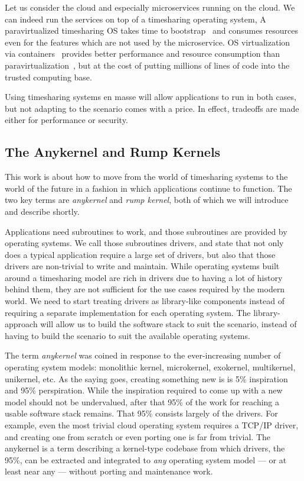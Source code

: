 Let us consider the cloud and especially microservices running on the cloud.
We can indeed run the services on top of a timesharing operating system,
A paravirtualized timesharing OS takes time to bootstrap~\cite{jiang:soda}
and consumes resources even for the features which are not used by
the microservice.  OS virtualization via containers~\cite{phk:jails}
provides better performance and resource consumption than
paravirtualization~\cite{soltesz:containers,wang:overhead}, but at the
cost of putting millions of lines of code into the trusted computing base.

Using timesharing systems en masse will allow applications to run in both
cases, but not adapting to the scenario comes with a price.  In effect,
tradeoffs are made either for performance or security.


\subsection{The Anykernel and Rump Kernels}

This work is about how to move from the world of timesharing systems
to the world of the future in a fashion in which applications continue
to function.  The two key terms are \textit{anykernel} and
\textit{rump kernel}, both of which we will introduce and describe shortly.

Applications need subroutines to work, and those subroutines are provided
by operating systems.  We call those subroutines drivers, and state that
not only does a typical application require a large set of drivers,
but also that those drivers are non-trivial to write and maintain.  While
operating systems built around a timesharing model are rich in drivers
due to having a lot of history behind them, they are not sufficient for
the use cases required by the modern world.  We need to
start treating drivers as library-like components instead of requiring a
separate implementation for each operating system.  The library-approach
will allow us to build the software stack to suit the scenario, instead of
having to build the scenario to suit the available operating systems.

The term \textit{anykernel} was coined in response to the ever-increasing
number of operating system models: monolithic kernel, microkernel,
exokernel, multikernel, unikernel, etc.  As the saying goes,
creating something new is is 5\% inspiration and 95\% perspiration.
While the inspiration required to come up with a new model should not be
undervalued, after that 95\% of the work for reaching a usable software
stack remains.  That 95\% consists largely of the drivers.  For example,
even the most trivial cloud operating system requires a TCP/IP driver,
and creating one from scratch or even porting one is far from trivial.
The anykernel is a term describing a kernel-type codebase from which
drivers, the 95\%, can be extracted and integrated to \textit{any}
operating system model --- or at least near any --- without porting and
maintenance work.

